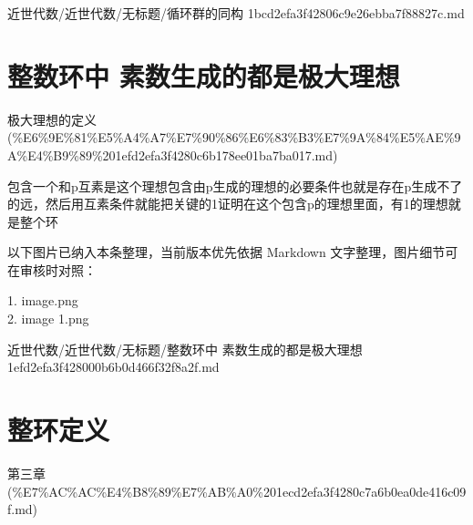 \begin{note}[来源路径]

近世代数/近世代数/无标题/循环群的同构 1bcd2efa3f42806c9e26ebba7f88827c.md

\end{note}

\section*{整数环中 素数生成的都是极大理想}

\begin{note}[来源上级主题]

极大理想的定义 (\%E6\%9E\%81\%E5\%A4\%A7\%E7\%90\%86\%E6\%83\%B3\%E7\%9A\%84\%E5\%AE\%9A\%E4\%B9\%89\%201efd2efa3f4280c6b178ee01ba7ba017.md)

\end{note}

\begin{note}

包含一个和p互素是这个理想包含由p生成的理想的必要条件也就是存在p生成不了的远，然后用互素条件就能把关键的1证明在这个包含p的理想里面，有1的理想就是整个环

\end{note}

\begin{note}[关联图片]
以下图片已纳入本条整理，当前版本优先依据 Markdown 文字整理，图片细节可在审核时对照：

1. image.png\\
2. image 1.png\\

\end{note}

\begin{note}[来源路径]

近世代数/近世代数/无标题/整数环中 素数生成的都是极大理想 1efd2efa3f428000b6b0d466f32f8a2f.md

\end{note}

\section*{整环定义}

\begin{note}[来源上级主题]

第三章 (\%E7\%AC\%AC\%E4\%B8\%89\%E7\%AB\%A0\%201ecd2efa3f4280c7a6b0ea0de416c09f.md)

\end{note}

